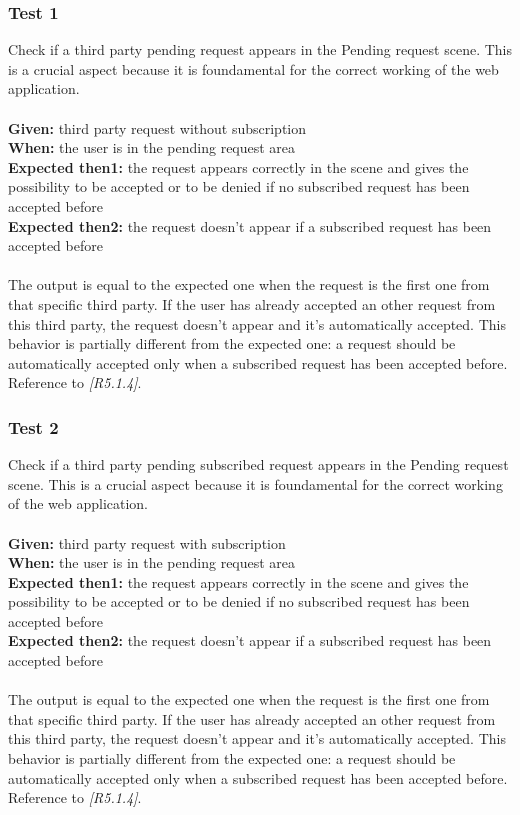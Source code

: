 \subsubsection{\Large{Test 1}}
Check if a third party pending request appears in the Pending request scene. This is a crucial aspect because it is foundamental for the correct working of the web application.  \\
\\
\textbf{Given: } third party request without subscription\\
\textbf{When: } the user is in the pending request area\\
\textbf{Expected then1: } the request appears correctly in the scene and gives the possibility to be accepted or to be denied if no subscribed request has been accepted before \\
\textbf{Expected then2: } the request doesn't appear if a subscribed request has been accepted before\\
\\
The output is equal to the expected one when the request is the first one from that specific third party. If the user has already accepted an other request from this third party, the request doesn't appear and it's automatically accepted. This behavior is partially different from the expected one: a request should be automatically accepted only when a subscribed request has been accepted before.\\
Reference to \textit{[R5.1.4]}.

\subsubsection{\Large{Test 2}}
Check if a third party pending subscribed request appears in the Pending request scene. This is a crucial aspect because it is foundamental for the correct working of the web application.\\
\\
\textbf{Given: } third party request with subscription\\
\textbf{When: } the user is in the pending request area\\
\textbf{Expected then1: }  the request appears correctly in the scene and gives the possibility to be accepted or to be denied if no subscribed request has been accepted before \\
\textbf{Expected then2: } the request doesn't appear if a subscribed request has been accepted before \\
\\
The output is equal to the expected one when the request is the first one from that specific third party. If the user has already accepted an other request from this third party, the request doesn't appear and it's automatically accepted. This behavior is partially different from the expected one: a request should be automatically accepted only when a subscribed request has been accepted before.\\
Reference to \textit{[R5.1.4]}.

